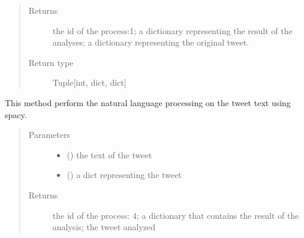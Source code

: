\documentclass[letterpaper,10pt,english]{sphinxmanual}
\begin{document}
\begin{fulllineitems}
\begin{fulllineitems}
\begin{quote}
\begin{description}
\begin{itemize}
\end{itemize}

\item[{Returns}] \leavevmode
\sphinxAtStartPar
the id of the process:1; a dictionary representing the result of the analyses; a dictionary representing the original tweet.

\item[{Return type}] \leavevmode
\sphinxAtStartPar
Tuple{[}int, dict, dict{]}

\end{description}\end{quote}

\end{fulllineitems}


\begin{fulllineitems}
\label{\detokenize{code_comment/tweet_processor:hate_tweet_map.tweets_processor.TweetProcessor.ProcessTweet.__process_text_with_spacy}}
\sphinxAtStartPar
This method perform the natural language processing on the tweet text using spacy.
\begin{quote}\begin{description}
\item[{Parameters}] \leavevmode\begin{itemize}
\item {} 
\sphinxAtStartPar
{} () \textendash{} the text of the tweet

\item {} 
\sphinxAtStartPar
{} () \textendash{} a dict representing the tweet

\end{itemize}

\item[{Returns}] \leavevmode
\sphinxAtStartPar
the id of the process: 4; a dictionary that contains the result of the analysis; the tweet analyzed


\end{description}
\end{quote}
\end{fulllineitems}
\end{fulllineitems}
\end{document}
